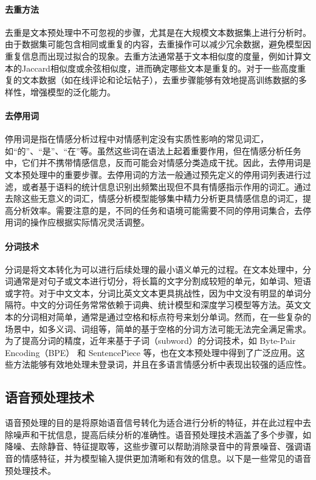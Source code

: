 \paragraph{去重方法}

去重是文本预处理中不可忽视的步骤，尤其是在大规模文本数据集上进行分析时。由于数据集可能包含相同或重复的内容，去重操作可以减少冗余数据，避免模型因重复信息而出现过拟合的现象。去重方法通常基于文本相似度的度量，例如计算文本的Jaccard相似度或余弦相似度，进而确定哪些文本是重复的。对于一些高度重复的文本数据（如在线评论和论坛帖子），去重步骤能够有效地提高训练数据的多样性，增强模型的泛化能力。

\paragraph{去停用词}

停用词是指在情感分析过程中对情感判定没有实质性影响的常见词汇，如“的”、“是”、“在”等。虽然这些词在语法上起着重要作用，但在情感分析任务中，它们并不携带情感信息，反而可能会对情感分类造成干扰。因此，去停用词是文本预处理中的重要步骤。去停用词的方法一般通过预先定义的停用词列表进行过滤，或者基于语料的统计信息识别出频繁出现但不具有情感指示作用的词汇。通过去除这些无意义的词汇，情感分析模型能够集中精力分析更具情感信息的词汇，提高分析效率。需要注意的是，不同的任务和语境可能需要不同的停用词集合，去停用词的操作应根据实际情况灵活调整。

\paragraph{分词技术}

分词是将文本转化为可以进行后续处理的最小语义单元的过程。在文本处理中，分词通常是对句子或文本进行切分，将长篇的文字分割成较短的单元，如单词、短语或字符。对于中文文本，分词比英文文本更具挑战性，因为中文没有明显的单词分隔符。中文的分词任务常常依赖于词典、统计模型和深度学习模型等方法。英文文本的分词相对简单，通常是通过空格和标点符号来划分单词。然而，在一些复杂的场景中，如多义词、词组等，简单的基于空格的分词方法可能无法完全满足需求。为了提高分词的精度，近年来基于子词（subword）的分词技术，如 Byte-Pair Encoding（BPE） 和 SentencePiece 等，也在文本预处理中得到了广泛应用。这些方法能够有效地处理未登录词，并且在多语言情感分析中表现出较强的适应性。

\subsection{语音预处理技术}

语音预处理的目的是将原始语音信号转化为适合进行分析的特征，并在此过程中去除噪声和干扰信息，提高后续分析的准确性。语音预处理技术涵盖了多个步骤，如降噪、去除静音、特征提取等，这些步骤可以帮助消除录音中的背景噪音、强调语音的情感特征，并为模型输入提供更加清晰和有效的信息。以下是一些常见的语音预处理技术。


